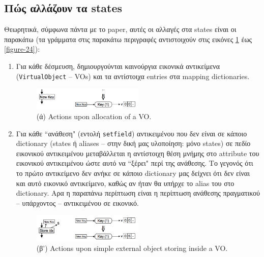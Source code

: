 \subsection{Πώς αλλάζουν τα states}

Θεωρητικά, σύμφωνα πάντα με το paper, αυτές οι αλλαγές στα states είναι οι
παρακάτω (τα γράμματα στις παρακάτω περιγραφές αντιστοιχούν στις εικόνες
\ref{figure-21} έως \ref{figure-24}):

\begin{enumerate}[label=\alph*]

\item Για κάθε δέσμευση, δημιουργούνται καινούργια εικονικά αντικείμενα \\
(\texttt{VirtualObject} – VOs) και τα αντίστοιχα entries στα mapping
dictionaries.

\begin{figure}[h]
\centering
\includegraphics[width=0.5\textwidth]{virtual-alloc.png}
\caption{(ά) Actions upon allocation of a VO. \cite{stadler2014partial}}
\label{figure-21}
\end{figure}

\item Για κάθε ``ανάθεση" (εντολή \texttt{setfield}) αντικειμένου που δεν είναι
σε κάποιο dictionary (states ή aliases – στην δική μας υλοποίηση: μόνο states)
σε πεδίο εικονικού αντικειμένου μεταβάλλεται η αντίστοιχη θέση μνήμης στο
attribute του εικονικού αντικειμένου ώστε αυτό να ``ξέρει" περί της ανάθεσης. Το
γεγονός ότι το πρώτο αντικείμενο δεν ανήκε σε κάποιο dictionary μας δείχνει ότι
δεν είναι και αυτό εικονικό αντικείμενο, καθώς αν ήταν θα υπήρχε το alias του
στο dictionary. Αρα η παραπάνω περίπτωση είναι η περίπτωση ανάθεσης πραγματικού
– υπάρχοντος – αντικειμένου σε εικονικό.

\begin{figure}[h]
\centering
\includegraphics[width=0.5\textwidth]{virtual-ext-store.png}
\caption{(β') Actions upon simple external object storing inside a VO. \cite{stadler2014partial}}
\label{figure-22}
\end{figure}


\end{enumerate}
